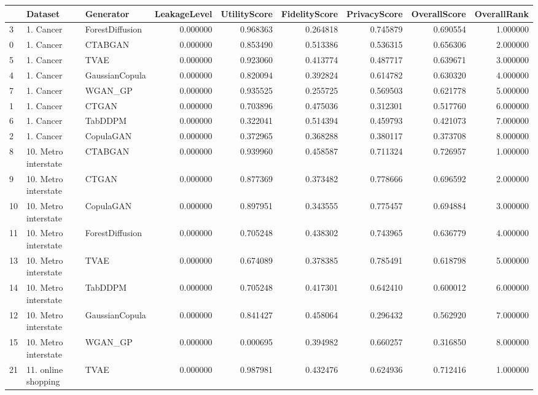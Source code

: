 \begin{tabular}{lllrrrrrr}
\toprule
 & Dataset & Generator & LeakageLevel & UtilityScore & FidelityScore & PrivacyScore & OverallScore & OverallRank \\
\midrule
3 & 1. Cancer & ForestDiffusion & 0.000000 & 0.968363 & 0.264818 & 0.745879 & 0.690554 & 1.000000 \\
0 & 1. Cancer & CTABGAN & 0.000000 & 0.853490 & 0.513386 & 0.536315 & 0.656306 & 2.000000 \\
5 & 1. Cancer & TVAE & 0.000000 & 0.923060 & 0.413774 & 0.487717 & 0.639671 & 3.000000 \\
4 & 1. Cancer & GaussianCopula & 0.000000 & 0.820094 & 0.392824 & 0.614782 & 0.630320 & 4.000000 \\
7 & 1. Cancer & WGAN_GP & 0.000000 & 0.935525 & 0.255725 & 0.569503 & 0.621778 & 5.000000 \\
1 & 1. Cancer & CTGAN & 0.000000 & 0.703896 & 0.475036 & 0.312301 & 0.517760 & 6.000000 \\
6 & 1. Cancer & TabDDPM & 0.000000 & 0.322041 & 0.514394 & 0.459793 & 0.421073 & 7.000000 \\
2 & 1. Cancer & CopulaGAN & 0.000000 & 0.372965 & 0.368288 & 0.380117 & 0.373708 & 8.000000 \\
8 & 10. Metro interstate & CTABGAN & 0.000000 & 0.939960 & 0.458587 & 0.711324 & 0.726957 & 1.000000 \\
9 & 10. Metro interstate & CTGAN & 0.000000 & 0.877369 & 0.373482 & 0.778666 & 0.696592 & 2.000000 \\
10 & 10. Metro interstate & CopulaGAN & 0.000000 & 0.897951 & 0.343555 & 0.775457 & 0.694884 & 3.000000 \\
11 & 10. Metro interstate & ForestDiffusion & 0.000000 & 0.705248 & 0.438302 & 0.743965 & 0.636779 & 4.000000 \\
13 & 10. Metro interstate & TVAE & 0.000000 & 0.674089 & 0.378385 & 0.785491 & 0.618798 & 5.000000 \\
14 & 10. Metro interstate & TabDDPM & 0.000000 & 0.705248 & 0.417301 & 0.642410 & 0.600012 & 6.000000 \\
12 & 10. Metro interstate & GaussianCopula & 0.000000 & 0.841427 & 0.458064 & 0.296432 & 0.562920 & 7.000000 \\
15 & 10. Metro interstate & WGAN_GP & 0.000000 & 0.000695 & 0.394982 & 0.660257 & 0.316850 & 8.000000 \\
21 & 11. online shopping & TVAE & 0.000000 & 0.987981 & 0.432476 & 0.624936 & 0.712416 & 1.000000 \\

\end{tabular}
